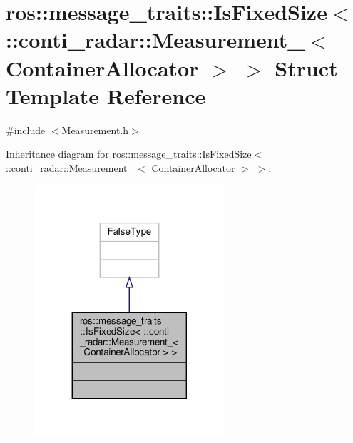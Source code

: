 \hypertarget{structros_1_1message__traits_1_1IsFixedSize_3_01_1_1conti__radar_1_1Measurement___3_01ContainerAllocator_01_4_01_4}{}\section{ros\+:\+:message\+\_\+traits\+:\+:Is\+Fixed\+Size$<$ \+:\+:conti\+\_\+radar\+:\+:Measurement\+\_\+$<$ Container\+Allocator $>$ $>$ Struct Template Reference}
\label{structros_1_1message__traits_1_1IsFixedSize_3_01_1_1conti__radar_1_1Measurement___3_01ContainerAllocator_01_4_01_4}


{\ttfamily \#include $<$Measurement.\+h$>$}



Inheritance diagram for ros\+:\+:message\+\_\+traits\+:\+:Is\+Fixed\+Size$<$ \+:\+:conti\+\_\+radar\+:\+:Measurement\+\_\+$<$ Container\+Allocator $>$ $>$\+:\nopagebreak
\begin{figure}[H]
\begin{center}
\leavevmode
\includegraphics[width=200pt]{dc/da8/structros_1_1message__traits_1_1IsFixedSize_3_01_1_1conti__radar_1_1Measurement___3_01ContainerAb730014376bcddcacc674486eb3026ac}
\end{center}
\end{figure}


